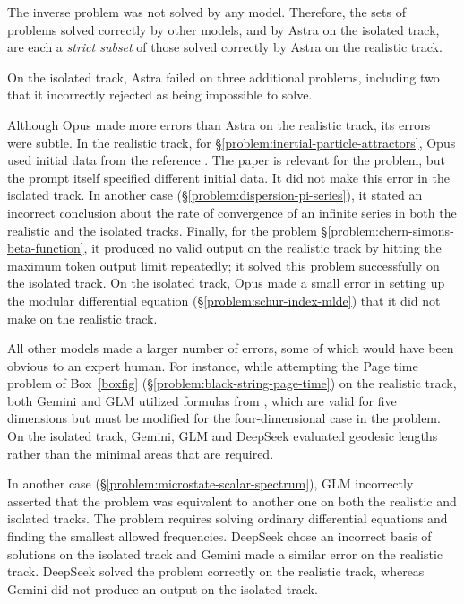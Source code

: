 \documentclass[aps,prd,reprint,superscriptaddress,nofootinbib]{revtex4-2}
\newcommand{\problemsymbol}{\S}
\DeclareRobustCommand{\problemref}[1]{\hyperref[#1]{\mbox{\problemsymbol\ref*{#1}}}}
\begin{document}
The inverse problem was not solved by any model. Therefore, the sets of problems solved correctly by other models, and by Astra on the isolated track, are each a {\em strict subset} of those solved correctly by Astra on the realistic track. 

On the isolated track, Astra failed on three additional problems, including two that it incorrectly rejected as being impossible to solve. 

Although Opus made more errors than Astra on the realistic track, its errors were subtle.  In the realistic track, for \problemref{problem:inertial-particle-attractors}, Opus used initial data from the reference \cite{kapoor2024trapping}. The paper is relevant for the problem, but the prompt itself specified different initial data.  It did not make this error in the isolated track. In another case (\problemref{problem:dispersion-pi-series}), it stated an incorrect conclusion about the rate of convergence of an infinite series in both the realistic and the isolated tracks. Finally, for the problem \problemref{problem:chern-simons-beta-function}, it produced no valid output on the realistic track by hitting the maximum token output limit repeatedly; it solved this problem successfully on the isolated track.  On the isolated track, Opus made a small error in setting up the modular differential equation (\problemref{problem:schur-index-mlde}) that it did not make on the realistic track.

All other models made a larger number of errors, some of which would have been obvious to an expert human. For instance, while attempting the Page time problem of Box~\ref{boxfig} (\problemref{problem:black-string-page-time}) on the realistic track, both Gemini and GLM utilized formulas from \cite{Geng:2020fxl}, which are valid for five dimensions but must be modified for the four-dimensional case in the problem. On the isolated track, Gemini, GLM and DeepSeek evaluated geodesic lengths rather than the minimal areas that are required. 

In another case (\problemref{problem:microstate-scalar-spectrum}), GLM incorrectly asserted that the problem was equivalent to another one on both the realistic and isolated tracks. The problem requires solving ordinary differential equations and finding the smallest allowed frequencies. DeepSeek chose an incorrect basis of solutions on the isolated track and Gemini made a similar error on the realistic track. DeepSeek solved the problem correctly on the realistic track, whereas Gemini did not produce an output on the isolated track.
\end{document}
